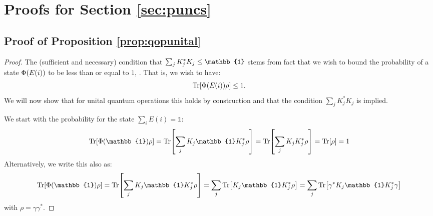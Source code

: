 \section{Proofs for Section \ref{sec:puncs}}

\subsection{Proof of Proposition \ref{prop:qopunital}}
\label{sec:proof:prop:qopunital}

\propqopunital*

\begin{proof}
	The (sufficient and necessary) condition that $\sum_j \kraus_j^* \kraus_j \leq \mathbb{1}$ stems from fact that we wish to bound the probability of a state $\Phi (E(i))$ to be less than or equal to $1$, \cf \citep[Proof of Theorem 8.1]{nielsen2001quantum}. That is, we wish to have:
	\begin{align}
		\Tr [ \Phi (E(i)) \rho] \leq 1. \label{eq:proof:unitalvalid:bound}
	\end{align}
	We will now show that for unital quantum operations this holds by construction and that the condition $\sum_j K_j^* K_j$ is implied.

	We start with the probability for the state $\sum_i E(i)=\mathbb{1}$:
	\begin{align}
		\Tr [ \qop (\mathbb{1}) \rho]
		=
		\Tr [ \sum_j \kraus_j  \mathbb{1} \kraus_j^* \rho ]
		=
		\Tr [ \sum_j \kraus_j  \kraus_j^* \rho ]
		=
		\Tr [  \rho ] =1
	\end{align}
	Alternatively, we write this also as:
	\begin{align}
		\Tr [ \qop (\mathbb{1}) \rho]
		=
		\Tr [ \sum_j \kraus_j  \mathbb{1} \kraus_j^* \rho ]
		=
		\sum_j \Tr [ \kraus_j  \mathbb{1} \kraus_j^* \rho ]
		=
		\sum_j \Tr [\gamma^* \kraus_j  \mathbb{1} \kraus_j^* \gamma ]
	\end{align}
	with $\rho=\gamma \gamma^*$.


\end{proof}
